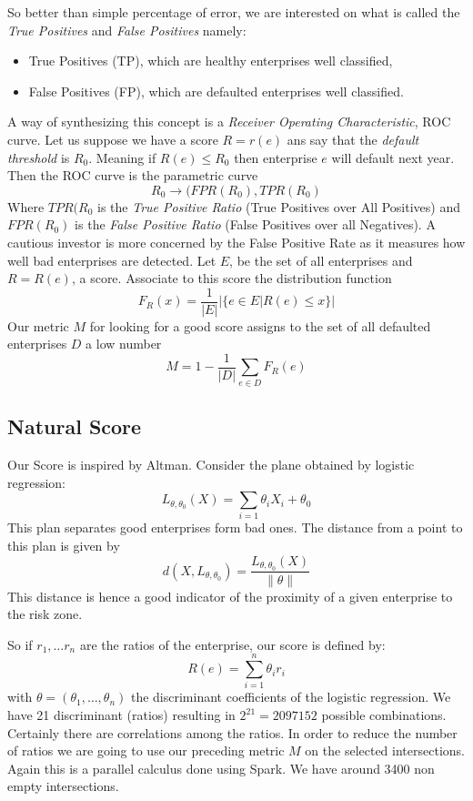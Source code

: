 \documentclass[DIV=calc, paper=a4, fontsize=11pt, twocolumn]{scrartcl}
\begin{document}
So better than simple percentage of error, we are interested on what is called the \emph{True Positives} and \emph{False Positives} namely:
\begin{itemize}
\item[] True Positives (TP), which are healthy enterprises well classified,
\item[] False Positives (FP), which are defaulted enterprises well classified.
\end{itemize}
A way of synthesizing this concept is a \emph{Receiver Operating Characteristic}, ROC curve. Let us suppose we have a score $R = r(e)$ ans say
that the \emph{default threshold} is $R_0$. Meaning if $R(e) \le R_0$ then enterprise $e$ will default next year. Then the ROC curve is the 
parametric curve
$$R_0 \to (FPR(R_0), TPR(R_0)$$
Where $TPR(R_0$ is the \emph{True Positive Ratio} (True Positives over All Positives) and $FPR(R_0)$ is the \emph{False Positive Ratio} 
(False Positives over all Negatives). A cautious investor is more concerned by the False Positive Rate as it measures how well bad 
enterprises are detected.
Let $E$, be the set of all enterprises and $R =R(e)$, a score. Associate to this score the distribution function
$$F_R(x) = \frac{1}{|E|} | \{ e \in E | R(e) \leq x \} | $$
Our metric $M$ for looking for a good score assigns to the set of all defaulted enterprises $D$ a low number
$$M = 1 - \frac{1}{|D|} \sum_{e \in D} F_R(e)$$

\subsection{Natural Score}
Our Score is inspired by Altman. Consider the plane obtained by logistic regression:
$$L_{\theta, \theta_0}(X) = \sum_{i=1} \theta_i X_i + \theta_0$$
This plan separates good enterprises form bad ones. The distance from a point to this plan is given by
$$d(X, L_{\theta, \theta_0}) = \frac{L_{\theta, \theta_0}(X)}{\| \theta \|}$$
This distance is hence a good indicator of the proximity of a given enterprise to the risk zone.

So if $r_1, \ldots r_n$ are the ratios of the enterprise, our score is defined by:
$$R(e) = \sum_{i=1}^n \theta_i r_i$$
with $\theta = (\theta_1, \ldots, \theta_n)$ the discriminant coefficients of the logistic regression.
We have 21 discriminant (ratios) resulting in $2^{21} = 2 097 152$ possible combinations. Certainly there are correlations 
among the ratios. In order to reduce the number of ratios we are going to use our preceding metric $M$ on the selected intersections.
Again this is a parallel calculus done using Spark. We have around 3400 non empty intersections.
\end{document}
